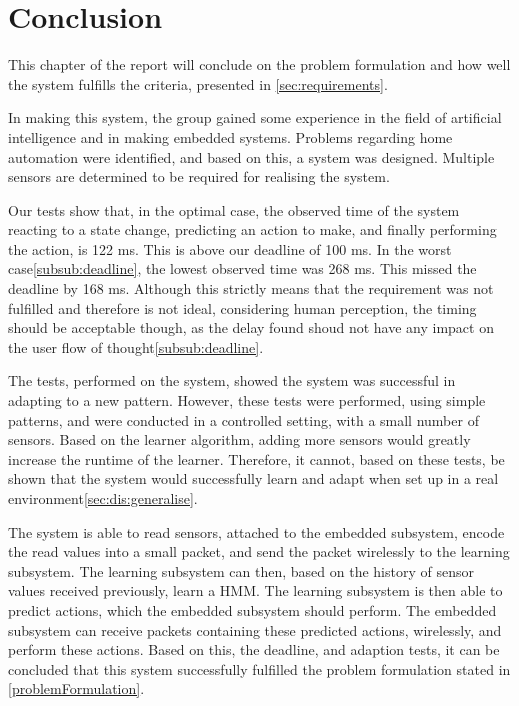 \chapter{Conclusion}

This chapter of the report will conclude on the problem formulation and how well the system fulfills the criteria, presented in \cref{sec:requirements}.

In making this system, the group gained some experience in the field of artificial intelligence and in making embedded systems. Problems regarding home automation were identified, and based on this, a system was designed. Multiple sensors are determined to be required for realising the system. 

Our tests show that, in the optimal case, the observed time of the system reacting to a state change, predicting an action to make, and finally performing the action, is 122 ms. This is above our deadline of 100 ms. In the worst case\cref{subsub:deadline}, the lowest observed time was 268 ms. This missed the deadline by 168 ms. Although this strictly means that the requirement was not fulfilled and therefore is not ideal, considering human perception, the timing should be acceptable though, as the delay found shoud not have any impact on the user flow of thought\cref{subsub:deadline}.

The tests, performed on the system, showed the system was successful in adapting to a new pattern. However, these tests were performed, using simple patterns, and were conducted in a controlled setting, with a small number of sensors. Based on the learner algorithm, adding more sensors would greatly increase the runtime of the learner. Therefore, it cannot, based on these tests, be shown that the system would successfully learn and adapt when set up in a real environment\cref{sec:dis:generalise}.

The system is able to read sensors, attached to the embedded subsystem, encode the read values into a small packet, and send the packet wirelessly to the learning subsystem. The learning subsystem can then, based on the history of sensor values received previously, learn a HMM. The learning subsystem is then able to predict actions, which the embedded subsystem should perform. The embedded subsystem can receive packets containing these predicted actions, wirelessly, and perform these actions. Based on this, the deadline, and adaption tests, it can be concluded that this system successfully fulfilled the problem formulation stated in \cref{problemFormulation}.  
